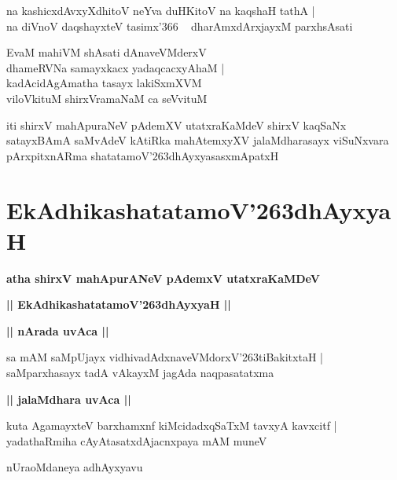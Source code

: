 \documentclass[twoside,12pt,openright]{book}
\def\S{\char'263}
\newcounter{shloka}[chapter]
\def\uvaca#1{\centerline{{\large\textbf{#1}}}}
\begin{document}
\begin{shloka}%
na kashicxdAvxyXdhitoV neYva duHKitoV na kaqshaH tathA |\\
na diVnoV daqshayxteV tasimx\char'366 ~ dharAmxdArxjayxM parxhsAsati 
\end{shloka}

\begin{shloka}%
EvaM mahiVM shAsati dAnaveVMderxV \\
dhameRVNa samayxkacx yadaqcacxyAhaM |\\
kadAcidAgAmatha tasayx lakiSxmXVM \\
viloVkituM shirxVramaNaM ca seVvituM 
\end{shloka}

\begin{center}
iti shirxV mahApuraNeV pAdemXV utatxraKaMdeV shirxV kaqSaNx satayxBAmA saMvAdeV kAtiRka 
mahAtemxyXV jalaMdharasayx viSuNxvara pArxpitxnARma shatatamoV\S dhAyxyasasxmApatxH 
\end{center}

\chapter{EkAdhikashatatamoV\S dhAyxyaH}

\begin{center}
{\LARGE\bfseries atha shirxV mahApurANeV pAdemxV utatxraKaMDeV}
\end{center}

\begin{center}
{\LARGE\bfseries || EkAdhikashatatamoV\S dhAyxyaH || }
\end{center}

\uvaca{|| nArada uvAca ||}

\begin{shloka}%
sa mAM saMpUjayx vidhivadAdxnaveVMdorxV\S tiBakitxtaH |\\
saMparxhasayx tadA vAkayxM jagAda naqpasatatxma 
\end{shloka}

\uvaca{|| jalaMdhara uvAca ||}

\begin{shloka}%
kuta AgamayxteV barxhamxnf kiMcidadxqSaTxM tavxyA kavxcitf |\\
yadathaRmiha cAyAtasatxdAjacnxpaya mAM muneV
\end{shloka}

\begin{center}
nUraoMdaneya adhAyxyavu
\end{center}
\end{document}
